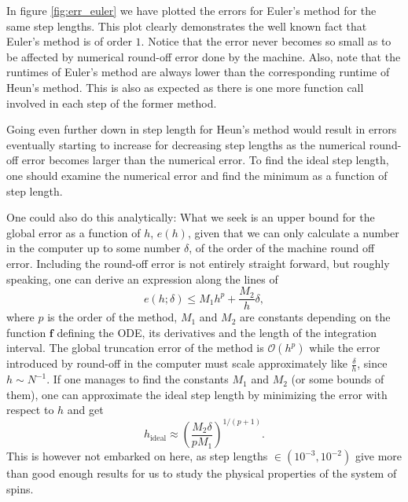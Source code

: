 In figure \ref{fig:err_euler} we have plotted the errors for Euler's method for the same step lengths. This plot clearly demonstrates the well known fact that Euler's method is of order $1$. Notice that the error never becomes so small as to be affected by numerical round-off error done by the machine. Also, note that the runtimes of Euler's method are always lower than the corresponding runtime of Heun's method. This is also as expected as there is one more function call involved in each step of the former method. 

\begin{remark}
	Going even further down in step length for Heun's method would result in errors eventually starting to increase for decreasing step lengths as the numerical round-off error becomes larger than the numerical error. To find the ideal step length, one should examine the numerical error and find the minimum as a function of step length. 
	
	One could also do this analytically: What we seek is an upper bound for the global error as a function of $h$, $e(h)$, given that we can only calculate a number in the computer up to some number $\delta$, of the order of the machine round off error. Including the round-off error is not entirely straight forward, but roughly speaking, one can derive an expression along the lines of 
	$$
		e(h; \delta) \leq M_1 h^p + \frac{M_2}{h} \delta, 
	$$ 
	where $p$ is the order of the method, $M_1$ and $M_2$ are constants depending on the function $\mathbf{f}$ defining the ODE, its derivatives and the length of the integration interval. The global truncation error of the method is $\mathcal{O}(h^p)$ while the error introduced by round-off in the computer must scale approximately like $\frac{\delta}{h}$, since $h\sim N^{-1}$. If one manages to find the constants $M_1$ and $M_2$ (or some bounds of them), one can approximate the ideal step length by minimizing the error with respect to $h$ and get 
	$$
		h_{\text{ideal}} \approx \left( \frac{M_2 \delta}{p M_1}  \right)^{1/(p+1)}.
	$$
	This is however not embarked on here, as step lengths $\in (10^{-3},10^{-2})$ give more than good enough results for us to study the physical properties of the system of spins.
\end{remark}
 
